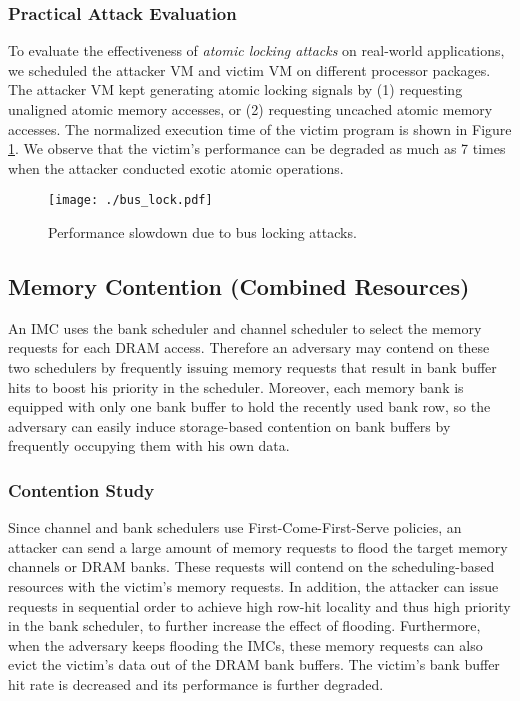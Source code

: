 \documentclass{sig-alternate}
\newcommand{\bheading}[1]{{\vspace{2pt}\noindent{\textbf{#1}}\hspace{2pt}}}
\begin{document}
\subsubsection{Practical Attack Evaluation}
To evaluate the effectiveness of \emph{atomic locking attacks} on real-world applications, 
we scheduled the attacker VM and victim VM on different processor packages. The attacker 
VM kept generating atomic locking signals by (1) requesting unaligned atomic memory 
accesses, or (2) requesting uncached atomic memory accesses. The normalized execution time 
of the victim program is shown in Figure \ref{fig:bus_lock}. We observe that the 
victim's performance can be degraded as much as 7 times when the attacker conducted
exotic atomic operations.

\begin{figure}[ht]
\centerline{\mbox{\texttt{[image: ./bus\_lock.pdf]}} }
\caption{Performance slowdown due to bus locking attacks.}
\label{fig:bus_lock}
\end{figure}


\subsection{Memory Contention (Combined Resources)}
\label{sec:IMC_contention}

An IMC uses the bank scheduler and channel scheduler to select the memory requests for each DRAM access. Therefore an adversary may contend on these two schedulers by frequently issuing memory requests that result in bank buffer hits to boost his priority in the scheduler. Moreover, each memory bank is equipped with only one bank buffer to hold the recently used bank row, so the adversary can easily induce storage-based contention on bank buffers by frequently occupying them with his own data.


\subsubsection{Contention Study}

\bheading{Memory flooding.}
Since channel and bank schedulers use First-Come-First-Serve policies, an attacker can send a large amount of memory requests to flood the target memory channels or DRAM banks. These requests will contend on the scheduling-based resources with the victim's memory requests. In addition, the attacker can issue requests in sequential order to achieve high row-hit locality and thus high priority in the bank scheduler, to further increase the effect of flooding. Furthermore, when the adversary keeps flooding the IMCs, these memory requests can also evict the victim's data out of the DRAM bank buffers. The victim's bank 
buffer hit rate is decreased and its performance is further degraded.
\end{document}
